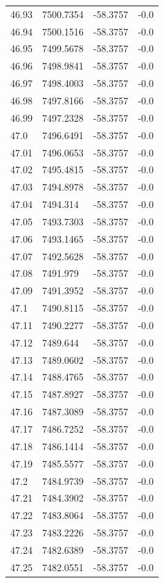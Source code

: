 \begin{table}[H]
\begin{tabular}{llll}
46.93 & 7500.7354 & -58.3757 & -0.0 \\
46.94 & 7500.1516 & -58.3757 & -0.0 \\
46.95 & 7499.5678 & -58.3757 & -0.0 \\
46.96 & 7498.9841 & -58.3757 & -0.0 \\
46.97 & 7498.4003 & -58.3757 & -0.0 \\
46.98 & 7497.8166 & -58.3757 & -0.0 \\
46.99 & 7497.2328 & -58.3757 & -0.0 \\
47.0 & 7496.6491 & -58.3757 & -0.0 \\
47.01 & 7496.0653 & -58.3757 & -0.0 \\
47.02 & 7495.4815 & -58.3757 & -0.0 \\
47.03 & 7494.8978 & -58.3757 & -0.0 \\
47.04 & 7494.314 & -58.3757 & -0.0 \\
47.05 & 7493.7303 & -58.3757 & -0.0 \\
47.06 & 7493.1465 & -58.3757 & -0.0 \\
47.07 & 7492.5628 & -58.3757 & -0.0 \\
47.08 & 7491.979 & -58.3757 & -0.0 \\
47.09 & 7491.3952 & -58.3757 & -0.0 \\
47.1 & 7490.8115 & -58.3757 & -0.0 \\
47.11 & 7490.2277 & -58.3757 & -0.0 \\
47.12 & 7489.644 & -58.3757 & -0.0 \\
47.13 & 7489.0602 & -58.3757 & -0.0 \\
47.14 & 7488.4765 & -58.3757 & -0.0 \\
47.15 & 7487.8927 & -58.3757 & -0.0 \\
47.16 & 7487.3089 & -58.3757 & -0.0 \\
47.17 & 7486.7252 & -58.3757 & -0.0 \\
47.18 & 7486.1414 & -58.3757 & -0.0 \\
47.19 & 7485.5577 & -58.3757 & -0.0 \\
47.2 & 7484.9739 & -58.3757 & -0.0 \\
47.21 & 7484.3902 & -58.3757 & -0.0 \\
47.22 & 7483.8064 & -58.3757 & -0.0 \\
47.23 & 7483.2226 & -58.3757 & -0.0 \\
47.24 & 7482.6389 & -58.3757 & -0.0 \\
47.25 & 7482.0551 & -58.3757 & -0.0 \\

\end{tabular}
\end{table}
